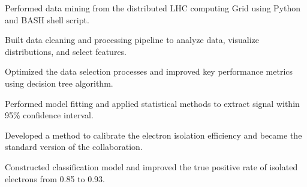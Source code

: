 \documentclass[letterpaper]{deedy-resume-openfont}
\begin{document}
\begin{tightemize}
\item Performed data mining from the distributed LHC computing Grid using Python and BASH shell script.
\item Built data cleaning and processing pipeline to analyze data, visualize distributions, and select features.
\item Optimized the data selection processes and improved key performance metrics using decision tree algorithm.
\item Performed model fitting and applied statistical methods to extract signal within 95\% confidence interval.
\item Developed a method to calibrate the electron isolation efficiency and became the standard version of the collaboration.
\item Constructed classification model and improved the true positive rate of isolated electrons from 0.85 to 0.93.

\end{tightemize}
\end{document}
